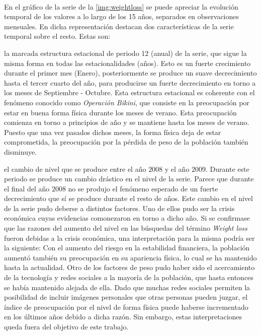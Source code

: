 \documentclass[a4paper, spanish]{article}
\begin{document}
      \paragraph{}
      En el gráfico de la serie de la \autoref{img:weightloss} se puede apreciar la evolución temporal de los valores a lo largo de los 15 años, separados en observaciones mensuales. En dicha representación destacan dos características de la serie temporal sobre el resto. Estas son:
        \begin{enumerate*}[label=(\arabic*)]
          \item la marcada estructura estacional de periodo 12 (anual) de la serie, que sigue la misma forma en todas las estacionalidades (años). Esto es un fuerte crecimiento durante el primer mes (Enero), posteriormente se produce un suave decrecimiento hasta el tercer cuarto del año, para producirse un fuerte decrecimiento en torno a los meses de Septiembre - Octubre. Esta estructura estacional es coherente con el fenómeno conocido como \emph{Operación Bikini}, que consiste en la preocupación por estar en buena forma física durante los meses de verano. Esta preocupación comienza en torno a principios de año y se mantiene hasta los meses de verano. Puesto que una vez pasados dichos meses, la forma física deja de estar comprometida, la preocupación por la pérdida de peso de la población también disminuye.
          \item el cambio de nivel que se produce entre el año $2008$ y el año $2009$. Durante este periodo se produce un cambio drástico en el nivel de la serie. Parece que durante el final del año $2008$ no se produjo el fenómeno esperado de un fuerte decrecimiento que sí se produce durante el resto de años. Este cambio en el nivel de la serie pudo deberse a distintos factores. Uno de ellos pudo ser la crisis económica cuyas evidencias comonezaron en torno a dicho año. Si se confirmase que las razones del aumento del nivel en las búsquedas del término \emph{Weight loss} fueron debidas a la crisis económica, una interpretación para la misma podría ser la siguiente: Con el aumento del riesgo en la estabilidad financiera, la población aumentó también su preocupación en su apariencia física, lo cual se ha mantenido hasta la actualidad. Otro de los factores de peso pudo haber sido el acercamiento de la tecnología y redes sociales a la mayoría de la población, que hasta entonces se había mantenido alejada de ella. Dado que muchas redes sociales permiten la posibilidad de incluir imágenes personales que otras personas pueden juzgar, el índice de preocupación por el nivel de forma física puede haberse incrementado en los últimos años debido a dicha razón. Sin embargo, estas interpretaciones queda fuera del objetivo de este trabajo.
        \end{enumerate*}
\end{document}
